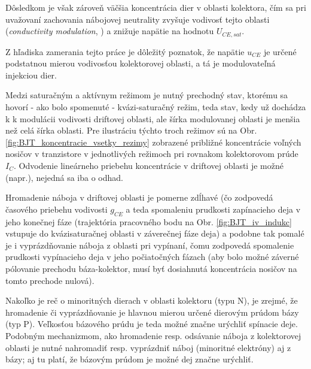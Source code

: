 
Dôsledkom je však zároveň väčšia koncentrácia dier v oblasti kolektora, čím sa pri uvažovaní zachovania nábojovej neutrality zvyšuje vodivosť tejto oblasti (\textit{conductivity modulation}, \cite{shockley}) a znižuje napätie na hodnotu $U_{CE,sat}$.

Z hľadiska zamerania tejto práce je dôležitý poznatok, že napätie $u_{CE}$ je určené podstatnou mierou vodivosťou kolektorovej oblasti, a tá je modulovateľná  injekciou dier.

Medzi saturačným a aktívnym režimom je nutný prechodný stav, ktorému sa hovorí - ako bolo spomenuté - kvázi-saturačný režim, teda stav, kedy už dochádza k k modulácii vodivosti driftovej oblasti, ale šírka modulovanej oblasti je menšia než celá šírka oblasti. Pre ilustráciu týchto troch režimov sú na Obr. \ref{fig:BJT_koncentracie_vsetky_rezimy} zobrazené približné koncentrácie voľných nosičov v tranzistore v jednotlivých režimoch pri rovnakom kolektorovom prúde $I_C$. Odvodenie lineárneho priebehu koncentrácie v driftovej oblasti je možné (napr.\cite{lutz}), nejedná sa iba o odhad.


Hromadenie náboja v driftovej oblasti je pomerne zdĺhavé (čo zodpovedá  časového priebehu vodivosti $g_{CE}$ a teda spomaleniu prudkosti zapínacieho deja v jeho konečnej fáze (trajektória pracovného bodu na Obr. \ref{fig:BJT_iv_indukc} vstupuje do kvázisaturačnej oblasti v záverečnej fáze deja) a podobne tak pomalé je i vyprázdňovanie náboja z oblasti pri vypínaní, čomu zodpovedá spomalenie prudkosti vypínacieho deja v jeho počiatočných fázach (aby bolo možné záverné pólovanie prechodu báza-kolektor, musí byť dosiahnutá koncentrácia nosičov na tomto prechode nulová).

Nakoľko je reč o minoritných dierach v oblasti kolektoru (typu N), je zrejmé, že hromadenie či vyprázdňovanie je hlavnou mierou určené dierovým prúdom bázy (typ P). Veľkosťou bázového prúdu je teda možné značne urýchliť spínacie deje. Podobným mechanizmom, ako hromadenie resp. odsávanie náboja z kolektorovej oblasti je nutné nahromadiť resp. vyprázdniť náboj (minoritné elektróny) aj z bázy; aj tu platí, že bázovým prúdom je možné dej značne urýchliť.

